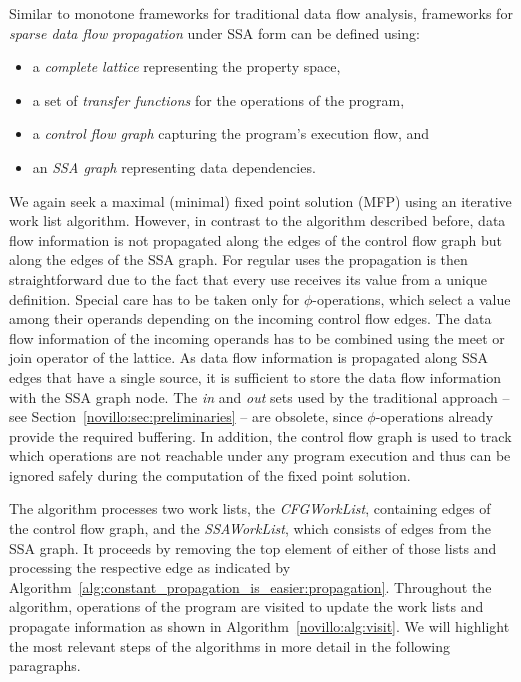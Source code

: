 Similar to monotone frameworks for traditional data flow analysis, frameworks
for \emph{sparse data flow propagation} under SSA form can be defined using:
\begin{itemize}
  \item a \emph{complete lattice} representing the property space,
  \item a set of \emph{transfer functions} for the operations of the program,
  \item a \emph{control flow graph} capturing the program's execution flow, and
  \item an \emph{SSA graph} representing data dependencies.
\end{itemize}
We again seek a maximal (minimal) fixed point solution (MFP) using an iterative
work list
algorithm. However, in contrast to the algorithm described before, data flow
information is not propagated along the edges of the control flow graph but
along the edges of the SSA graph. For regular uses the propagation is then
straightforward due
to the fact that every use receives its value from a unique definition. Special
care has to be taken only for $\phi$-operations, which select a value among
their operands depending on the incoming control flow edges. The data flow
information of the
incoming operands has to be combined using the meet or join operator of the
lattice. As data flow information is propagated along SSA edges that have a
single source, it is sufficient to store the data flow information with the SSA
graph
node. The \emph{in} and \emph{out} sets used by the traditional approach -- see
Section~\ref{novillo:sec:preliminaries} -- are obsolete, since
$\phi$-operations already provide the required buffering.
In addition, the
control flow graph is used to track which operations are not reachable under any
program execution and thus can be ignored safely during the computation of the
fixed point solution.

The algorithm processes two work lists, the \emph{CFGWorkList}, containing edges
of the control flow graph, and the \emph{SSAWorkList}, which consists of edges
from the
SSA graph. It proceeds by removing the top element of either of those lists and
processing the respective edge as indicated by
Algorithm~\ref{alg:constant_propagation_is_easier:propagation}. Throughout the algorithm, operations of
the program are visited to update the work lists and propagate
information as shown in Algorithm~\ref{novillo:alg:visit}. We will highlight
the most relevant steps of the algorithms in more detail in the following
paragraphs.

